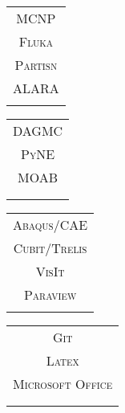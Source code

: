 \begin{minipage}{0.15\textwidth}
\begin{tabular}{c}
               \textsc{MCNP} \\
               \textsc{Fluka} \\
               \textsc{Partisn} \\
               \textsc{ALARA} \\
               \textsc{} \\
\end{tabular}
\end{minipage}%
\begin{minipage}{0.15\textwidth}
\begin{tabular}{c}
               \textsc{DAGMC} \\
               \textsc{PyNE} \\
               \textsc{MOAB} \\
               \textsc{} \\
               \textsc{} \\
\end{tabular}
\end{minipage}%
\begin{minipage}{0.24\textwidth}
\begin{tabular}{c}
               \textsc{Abaqus/CAE} \\
               \textsc{Cubit/Trelis} \\
               \textsc{VisIt} \\
               \textsc{Paraview} \\
               \textsc{} \\
\end{tabular}
\end{minipage}%
\begin{minipage}{0.24\textwidth}
\begin{tabular}{c}
               \textsc{Git} \\
               \textsc{Latex} \\
               \textsc{Microsoft Office} \\
               \textsc{} \\
               \textsc{} \\
\end{tabular}
\end{minipage}%
